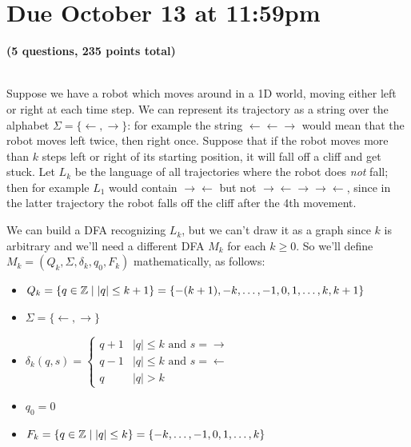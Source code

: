 \documentclass[11pt]{article}
\begin{document}
\maketitle

\section*{Due October 13 at 11:59pm}

\textbf{(5 questions, 235 points total)}

\begin{qunlist}

  \\
  Suppose we have a robot which moves around in a 1D world, moving either left or right at each time step.
  We can represent its trajectory as a string over the alphabet $\Sigma = \{ \leftarrow, \rightarrow \}$: for example the string $\leftarrow \leftarrow \rightarrow$ would mean that the robot moves left twice, then right once.
  Suppose that if the robot moves more than $k$ steps left or right of its starting position, it will fall off a cliff and get stuck.
  Let $L_k$ be the language of all trajectories where the robot does \emph{not} fall; then for example $L_1$ would contain $\rightarrow \leftarrow$ but not $\rightarrow \leftarrow \rightarrow \rightarrow \leftarrow$, since in the latter trajectory the robot falls off the cliff after the 4th movement.

  We can build a DFA recognizing $L_k$, but we can't draw it as a graph since $k$ is arbitrary and we'll need a different DFA $M_k$ for each $k \ge 0$.
  So we'll define $M_k = (Q_k, \Sigma, \delta_k, q_0, F_k)$ mathematically, as follows:

  \begin{itemize}
    \item $Q_k = \{ q \in \mathbb{Z} \;|\; |q| \le k+1 \} = \{ -(k+1), -k, \dots, -1, 0, 1, \dots, k, k+1 \}$
    \item $\Sigma = \{ \leftarrow, \rightarrow \}$
    \item $\delta_k(q, s) =
            \begin{cases}
              q + 1 & |q| \le k \text{ and } s = \rightarrow \\
              q - 1 & |q| \le k \text{ and } s = \leftarrow  \\
              q     & |q| > k
            \end{cases}$
    \item $q_0 = 0$
    \item $F_k = \{ q \in \mathbb{Z} \;|\; |q| \le k \} = \{ -k, \dots, -1, 0, 1, \dots, k \}$
  \end{itemize}


\end{qunlist}
\end{document}
